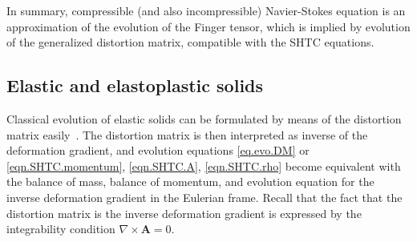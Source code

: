 \documentclass[twoside]{article}
\newcommand{\AAA}{{\boldsymbol{A}}}
\newcommand{\IP}[1]{ \textcolor{blue}   {\small\texttt{
\texttt{[image: pin\_small.jpeg]} Ilya: #1}} }
\newcommand{\MP}[1]{ \textcolor{Green}   {\small\texttt{
\texttt{[image: pin\_small.jpeg]} Michal: #1}} }
\begin{document}
\begin{comment}
\IP{Let's $ \eta $ be the volume viscosity. If we try to relate $ \beta $ and $ 
\tau_V $ to $ \eta $ we will get $ \eta \sim \tau_V \beta^2 $. Then, 
incompressibility means that $ \eta $ is very big, say $ \eta \rightarrow 
\infty $. Right? Hence, there in fact 2 
possibilities (i) either $ \beta \rightarrow 0 $, $ \tau_V \rightarrow \infty $ 
(ii) or 
$ \beta \rightarrow \infty $, $ \tau_V \rightarrow 0 $. Which is better, I 
don't know. However, only (i) seems describe the 
incompressibility. Like in the shear viscosity, when solids are recovered when 
$ \tau_S \rightarrow \infty $. OK, let's keep the inco-\\mpressibility note. 
Thanks. In reality this not exactly means that $ \tau\rightarrow\infty $ but 
that $ \tau_V \gg T $, where $ T $ is the characteristic macroscopic time. }
\MP{Agree.}
\end{comment}

In summary, compressible (and also incompressible) Navier-Stokes equation is an approximation of the evolution of the Finger tensor, 
which is implied by evolution of the generalized distortion matrix, compatible with the SHTC equations.






%



\subsection{Elastic and elastoplastic solids}

Classical evolution of elastic solids can be formulated by means of the 
distortion matrix easily~\cite{God1978,GodRom1998,GodRom2003}. The distortion 
matrix is 
then interpreted as inverse 
of the deformation gradient, and evolution equations \eqref{eq.evo.DM} or 
\eqref{eqn.SHTC.momentum}, \eqref{eqn.SHTC.A}, \eqref{eqn.SHTC.rho} 
become 
equivalent with the balance of mass, balance of momentum, and 
evolution equation for the inverse deformation gradient in the Eulerian frame. 
Recall that the fact that the distortion matrix is the inverse deformation 
gradient is expressed by the integrability condition $ \nabla\times\AAA = 0 $.
\end{document}
